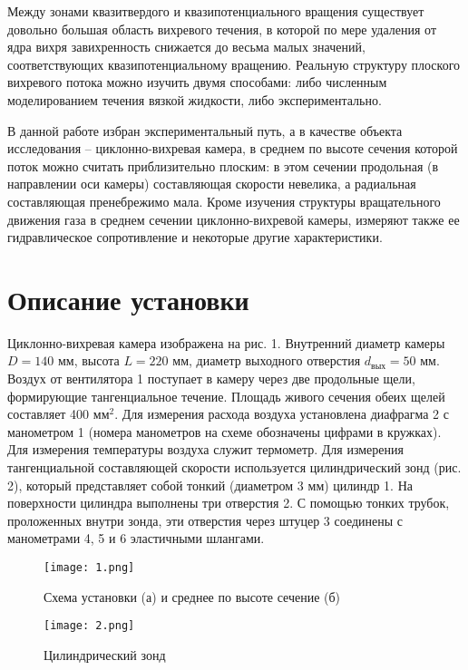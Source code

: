 \documentclass[12pt,a4paper]{article}
\begin{document}
Между зонами квазитвердого и квазипотенциального вращения существует довольно большая область вихревого
течения, в которой по мере удаления от ядра вихря завихренность
снижается до весьма малых значений, соответствующих квазипотенциальному вращению. Реальную структуру плоского вихревого потока можно изучить двумя способами: либо численным моделированием течения вязкой жидкости, либо экспериментально.

В данной работе избран экспериментальный путь, а в качестве
объекта исследования – циклонно-вихревая камера, в среднем по высоте сечения которой поток можно считать приблизительно плоским:
в этом сечении продольная (в направлении оси камеры) составляющая скорости невелика, а радиальная составляющая пренебрежимо
мала. Кроме изучения структуры вращательного движения газа в
среднем сечении циклонно-вихревой камеры, измеряют также ее гидравлическое сопротивление и некоторые другие характеристики.

\section{Описание установки}
Циклонно-вихревая камера изображена на рис. 1. Внутренний диаметр камеры $D = 140$ мм, высота $L = 220$ мм, диаметр выходного отверстия $d_{\text{вых}} = 50$ мм. Воздух от вентилятора 1 поступает в
камеру через две продольные щели, формирующие тангенциальное
течение. Площадь живого сечения обеих щелей составляет 400 мм$^2$.
Для измерения расхода воздуха установлена диафрагма 2 с манометром 1 (номера манометров на схеме обозначены цифрами в кружках). Для измерения температуры воздуха служит термометр.
Для измерения тангенциальной составляющей скорости используется цилиндрический зонд (рис. 2), который представляет
собой тонкий (диаметром 3 мм) цилиндр 1. На поверхности цилиндра
выполнены три отверстия 2. С помощью тонких трубок, проложенных
внутри зонда, эти отверстия через штуцер 3 соединены с манометрами 4, 5 и 6 эластичными шлангами. 
\begin{figure}[h]\center
\texttt{[image: 1.png]}
\caption{Схема установки (а) и среднее по высоте сечение (б)} \label{fig:1}
\end{figure}

\begin{figure}[h!]\center
\texttt{[image: 2.png]}
\caption{Цилиндрический зонд} \label{fig:2}
\end{figure}
\end{document}
